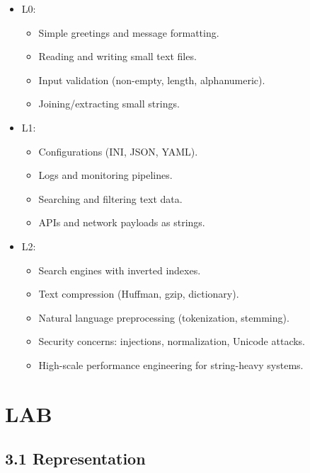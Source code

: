 \documentclass[
  letterpaper,
  DIV=11,
  numbers=noendperiod]{scrreprt}
\providecommand{\tightlist}{%
  \setlength{\itemsep}{0pt}\setlength{\parskip}{0pt}}
\begin{document}
\begin{itemize}
\item
  L0:

  \begin{itemize}
  \tightlist
  \item
    Simple greetings and message formatting.
  \item
    Reading and writing small text files.
  \item
    Input validation (non-empty, length, alphanumeric).
  \item
    Joining/extracting small strings.
  \end{itemize}
\item
  L1:

  \begin{itemize}
  \tightlist
  \item
    Configurations (INI, JSON, YAML).
  \item
    Logs and monitoring pipelines.
  \item
    Searching and filtering text data.
  \item
    APIs and network payloads as strings.
  \end{itemize}
\item
  L2:

  \begin{itemize}
  \tightlist
  \item
    Search engines with inverted indexes.
  \item
    Text compression (Huffman, gzip, dictionary).
  \item
    Natural language preprocessing (tokenization, stemming).
  \item
    Security concerns: injections, normalization, Unicode attacks.
  \item
    High-scale performance engineering for string-heavy systems.
  \end{itemize}
\end{itemize}

\section{LAB}\label{lab-1}

\subsection{3.1 Representation}\label{representation-3}
\end{document}
